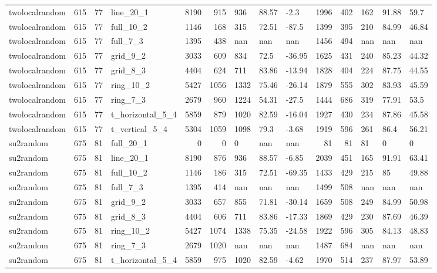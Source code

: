 \begin{longtable}{lrrlrrlllrrlll}
twolocalrandom & 615 & 77 & line\_20\_1 & 8190 & 915 & 936 & 88.57 & -2.3 & 1996 & 402 & 162 & 91.88 & 59.7 \\
twolocalrandom & 615 & 77 & full\_10\_2 & 1146 & 168 & 315 & 72.51 & -87.5 & 1399 & 395 & 210 & 84.99 & 46.84 \\
twolocalrandom & 615 & 77 & full\_7\_3 & 1395 & 438 & nan & nan & nan & 1456 & 494 & nan & nan & nan \\
twolocalrandom & 615 & 77 & grid\_9\_2 & 3033 & 609 & 834 & 72.5 & -36.95 & 1625 & 431 & 240 & 85.23 & 44.32 \\
twolocalrandom & 615 & 77 & grid\_8\_3 & 4404 & 624 & 711 & 83.86 & -13.94 & 1828 & 404 & 224 & 87.75 & 44.55 \\
twolocalrandom & 615 & 77 & ring\_10\_2 & 5427 & 1056 & 1332 & 75.46 & -26.14 & 1879 & 555 & 302 & 83.93 & 45.59 \\
twolocalrandom & 615 & 77 & ring\_7\_3 & 2679 & 960 & 1224 & 54.31 & -27.5 & 1444 & 686 & 319 & 77.91 & 53.5 \\
twolocalrandom & 615 & 77 & t\_horizontal\_5\_4 & 5859 & 879 & 1020 & 82.59 & -16.04 & 1927 & 430 & 234 & 87.86 & 45.58 \\
twolocalrandom & 615 & 77 & t\_vertical\_5\_4 & 5304 & 1059 & 1098 & 79.3 & -3.68 & 1919 & 596 & 261 & 86.4 & 56.21 \\
su2random & 675 & 81 & full\_20\_1 & 0 & 0 & 0 & nan & nan & 81 & 81 & 81 & 0 & 0 \\
su2random & 675 & 81 & line\_20\_1 & 8190 & 876 & 936 & 88.57 & -6.85 & 2039 & 451 & 165 & 91.91 & 63.41 \\
su2random & 675 & 81 & full\_10\_2 & 1146 & 186 & 315 & 72.51 & -69.35 & 1433 & 429 & 215 & 85 & 49.88 \\
su2random & 675 & 81 & full\_7\_3 & 1395 & 414 & nan & nan & nan & 1499 & 508 & nan & nan & nan \\
su2random & 675 & 81 & grid\_9\_2 & 3033 & 657 & 855 & 71.81 & -30.14 & 1659 & 508 & 249 & 84.99 & 50.98 \\
su2random & 675 & 81 & grid\_8\_3 & 4404 & 606 & 711 & 83.86 & -17.33 & 1869 & 429 & 230 & 87.69 & 46.39 \\
su2random & 675 & 81 & ring\_10\_2 & 5427 & 1074 & 1338 & 75.35 & -24.58 & 1922 & 596 & 305 & 84.13 & 48.83 \\
su2random & 675 & 81 & ring\_7\_3 & 2679 & 1020 & nan & nan & nan & 1487 & 684 & nan & nan & nan \\
su2random & 675 & 81 & t\_horizontal\_5\_4 & 5859 & 975 & 1020 & 82.59 & -4.62 & 1970 & 514 & 237 & 87.97 & 53.89 \\

\end{longtable}
